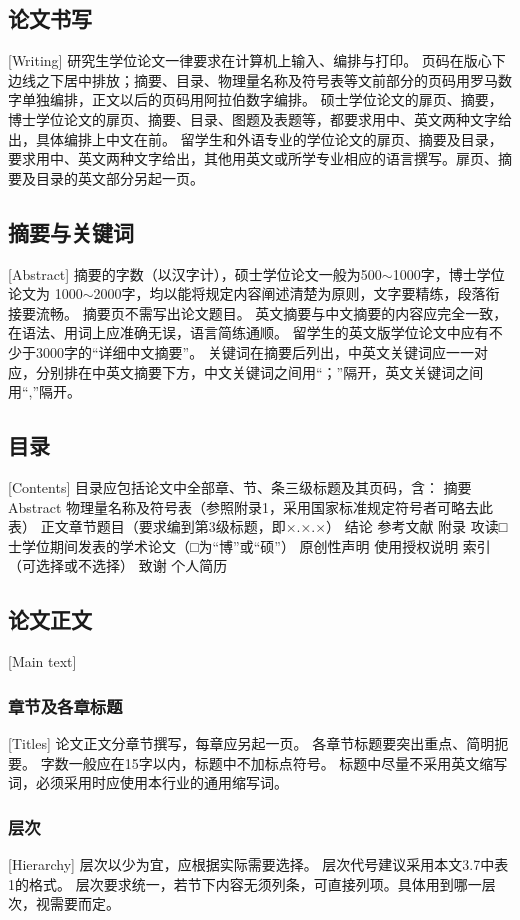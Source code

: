 \subsection{论文书写}[Writing]
研究生学位论文一律要求在计算机上输入、编排与打印。
页码在版心下边线之下居中排放；摘要、目录、物理量名称及符号表等文前部分的页码用罗马数字单独编排，正文以后的页码用阿拉伯数字编排。
硕士学位论文的扉页、摘要，博士学位论文的扉页、摘要、目录、图题及表题等，都要求用中、英文两种文字给出，具体编排上中文在前。
留学生和外语专业的学位论文的扉页、摘要及目录，要求用中、英文两种文字给出，其他用英文或所学专业相应的语言撰写。扉页、摘要及目录的英文部分另起一页。

\subsection{摘要与关键词}[Abstract]
摘要的字数（以汉字计），硕士学位论文一般为500$\sim$\num{1000}字，博士学位论文为
\num{1000}$\sim$\num{2000}字，均以能将规定内容阐述清楚为原则，文字要精练，段落衔
接要流畅。
摘要页不需写出论文题目。
英文摘要与中文摘要的内容应完全一致，在语法、用词上应准确无误，语言简练通顺。
留学生的英文版学位论文中应有不少于\num{3000}字的“详细中文摘要”。
关键词在摘要后列出，中英文关键词应一一对应，分别排在中英文摘要下方，中文关键词之间用“；”隔开，英文关键词之间用“,”隔开。

\subsection{目录}[Contents]
目录应包括论文中全部章、节、条三级标题及其页码，含：
摘要
Abstract
物理量名称及符号表（参照附录1，采用国家标准规定符号者可略去此表）
正文章节题目（要求编到第3级标题，即×.×.×）
结论
参考文献
附录
攻读□士学位期间发表的学术论文（□为“博”或“硕”）
原创性声明
使用授权说明
索引（可选择或不选择）
致谢
个人简历

\subsection{论文正文}[Main text]
\subsubsection{章节及各章标题}[Titles]
论文正文分章节撰写，每章应另起一页。
各章节标题要突出重点、简明扼要。
字数一般应在15字以内，标题中不加标点符号。
标题中尽量不采用英文缩写词，必须采用时应使用本行业的通用缩写词。
\subsubsection{层次}[Hierarchy]
层次以少为宜，应根据实际需要选择。
层次代号建议采用本文3.7中表1的格式。
层次要求统一，若节下内容无须列条，可直接列项。具体用到哪一层次，视需要而定。
